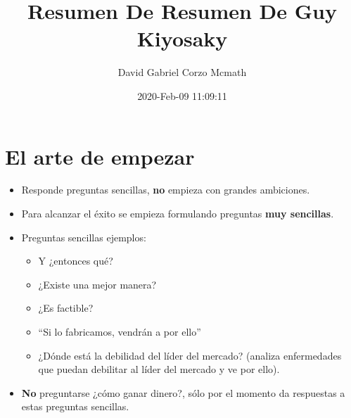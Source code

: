 \documentclass{article}
\title{Resumen De Resumen De Guy Kiyosaky}
\author{David Gabriel Corzo Mcmath}
\date{2020-Feb-09 11:09:11}
\begin{document}
\maketitle

\section{El arte de empezar}
\begin{itemize}
    \item Responde preguntas sencillas, \textbf{no} empieza con grandes ambiciones.
    \item Para alcanzar el éxito se empieza formulando preguntas \textbf{muy sencillas}.
    \item Preguntas sencillas ejemplos:
        \begin{itemize}
            \item Y ¿entonces qué?
            \item ¿Existe una mejor manera? 
            \item ¿Es factible? 
            \item ``Si lo fabricamos, vendrán a por ello''
            \item ¿Dónde está la debilidad del líder del mercado? (analiza enfermedades que puedan debilitar al líder del mercado y ve por ello).
        \end{itemize}
    
    \item \textbf{No} preguntarse ¿cómo ganar dinero?, sólo por el momento da respuestas a estas preguntas sencillas.
\end{itemize}


\end{document}

